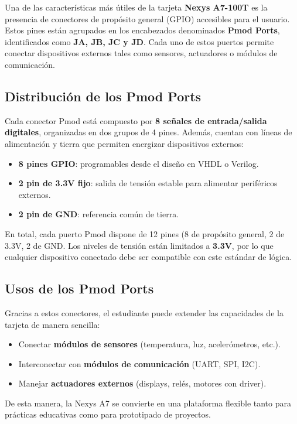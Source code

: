 \documentclass[a4paper,12pt]{article}
\begin{document}
Una de las características más útiles de la tarjeta \textbf{Nexys A7-100T} es la presencia de conectores de propósito general (GPIO) accesibles para el usuario. Estos pines están agrupados en los encabezados denominados \textbf{Pmod Ports}, identificados como \textbf{JA, JB, JC y JD}. Cada uno de estos puertos permite conectar dispositivos externos tales como sensores, actuadores o módulos de comunicación.

\subsection{Distribución de los Pmod Ports}
Cada conector Pmod está compuesto por \textbf{8 señales de entrada/salida digitales}, organizadas en dos grupos de 4 pines. Además, cuentan con líneas de alimentación y tierra que permiten energizar dispositivos externos:

\begin{itemize}
    \item \textbf{8 pines GPIO}: programables desde el diseño en VHDL o Verilog.
    \item \textbf{2 pin de 3.3V fijo}: salida de tensión estable para alimentar periféricos externos.
    \item \textbf{2 pin de GND}: referencia común de tierra.
\end{itemize}

En total, cada puerto Pmod dispone de 12 pines (8 de propósito general, 2 de 3.3V, 2 de GND. Los niveles de tensión están limitados a \textbf{3.3V}, por lo que cualquier dispositivo conectado debe ser compatible con este estándar de lógica.

\subsection{Usos de los Pmod Ports}
Gracias a estos conectores, el estudiante puede extender las capacidades de la tarjeta de manera sencilla:
\begin{itemize}
    \item Conectar \textbf{módulos de sensores} (temperatura, luz, acelerómetros, etc.).
    \item Interconectar con \textbf{módulos de comunicación} (UART, SPI, I2C).
    \item Manejar \textbf{actuadores externos} (displays, relés, motores con driver).
\end{itemize}

De esta manera, la Nexys A7 se convierte en una plataforma flexible tanto para prácticas educativas como para prototipado de proyectos.
\end{document}
